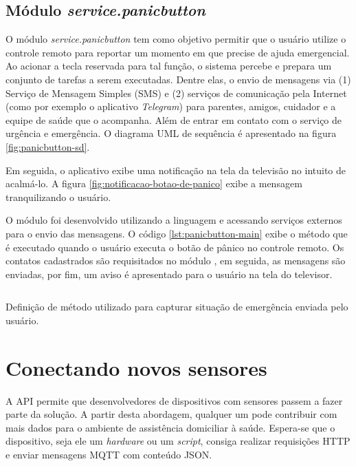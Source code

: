 \subsection{Módulo \textit{service.panicbutton}}\label{subsubsec:panicbutton}

O módulo \textit{service.panicbutton} tem como objetivo permitir que o usuário
utilize o controle remoto para reportar um momento em que precise de ajuda 
emergencial. Ao acionar a tecla reservada para tal função, o sistema percebe e
prepara um conjunto de tarefas a serem executadas. Dentre elas, o envio de 
mensagens via (1) Serviço de Mensagem Simples (SMS) e (2) serviços de comunicação
pela Internet (como por exemplo o aplicativo \textit{Telegram}) para parentes, 
amigos, cuidador e a equipe de saúde que o acompanha. Além de entrar em contato
com o serviço de urgência e emergência. O diagrama UML de sequência é apresentado
na figura \ref{fig:panicbutton-sd}.


Em seguida, o aplicativo exibe uma notificação na tela da televisão no intuito
de acalmá-lo. A figura \ref{fig:notificacao-botao-de-panico} exibe a mensagem 
tranquilizando o usuário.

O módulo foi desenvolvido utilizando a linguagem \python[] e acessando serviços
externos para o envio das mensagens. O código \ref{lst:panicbutton-main} exibe
o método que é executado quando o usuário executa o botão de pânico no controle
remoto. Os contatos cadastrados são requisitados no módulo \web, em seguida, as
mensagens são enviadas, por fim, um aviso é apresentado para o usuário na tela
do televisor.

\begin{listing}[ht!]
\inputminted{python}{codigos/panicbutton-main.py}
\caption{Definição de método utilizado para capturar situação de emergência enviada
pelo usuário.}
\label{lst:panicbutton-main}
\end{listing}

\section{Conectando novos sensores} \label{sec:conectando-novos-sensores}

A API permite que desenvolvedores de dispositivos com sensores passem a fazer
parte da solução. A partir desta abordagem, qualquer um pode contribuir  com
mais dados para o ambiente de assistência domiciliar à saúde. Espera-se que o
dispositivo, seja ele um \textit{hardware} ou um \textit{script}, consiga
realizar requisições HTTP e enviar mensagens MQTT com conteúdo JSON.


